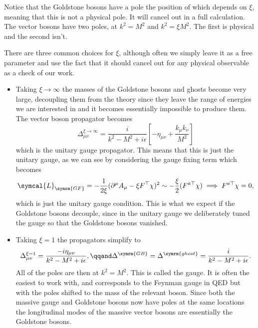 \documentclass[fleqn]{NotesClass}
\newcommand{\lagrangianDensity}{\symcal{L}}
\newcommand{\minkowskiMetric}{\eta}
\newcommand{\trans}{\top}
\begin{document}
    Notice that the Goldstone bosons have a pole the position of which depends on \(\xi\), meaning that this is not a physical pole.
    It will cancel out in a full calculation.
    The vector bosons have two poles, at \(k^2 = M^2\) and \(k^2 = \xi M^2\).
    The first is physical and the second isn't.
    
    There are three common choices for \(\xi\), although often we simply leave it as a free parameter and use the fact that it should cancel out for any physical observable as a check of our work.
    \begin{itemize}
        \item Taking \(\xi \to \infty\) the masses of the Goldstone bosons and ghosts become very large, decoupling them from the theory since they leave the range of energies we are interested in and it becomes essentially impossible to produce them.
        The vector boson propagator becomes
        \begin{equation}
            \Delta_{\mu\nu}^{\xi \to \infty} = \frac{i}{k^2 - M^2 + i\epsilon} \left[ -\minkowskiMetric_{\mu\nu} + \frac{k_\mu k_\nu}{M^2} \right]
        \end{equation}
        which is the unitary gauge propagator.
        This means that this is just the unitary gauge, as we can see by considering the gauge fixing term which becomes
        \begin{equation}
            \lagrangianDensity_{\symrm{GF}} = -\frac{1}{2\xi}(\partial^\mu A_\mu - \xi F^\trans \chi)^2 \sim -\frac{\xi}{2}(F^{a\trans} \chi) \implies F^{a\trans}\chi = 0,
        \end{equation}
        which is just the unitary gauge condition.
        This is what we expect if the Goldstone bosons decouple, since in the unitary gauge we deliberately tuned the gauge so that the Goldstone bosons vanished.
        
        \item Taking \(\xi = 1\) the propagators simplify to
        \begin{equation}
            \Delta_{\mu\nu}^{\xi = 1} = \frac{-i\minkowskiMetric_{\mu\nu}}{k^2 - M^2 + i\epsilon}, \qqand \Delta^{\symrm{GB}} = \Delta^{\symrm{ghost}} = \frac{i}{k^2 - M^2 + i\epsilon}.
        \end{equation}
        All of the poles are then at \(k^2 = M^2\).
        This is called the  gauge.
        It is often the easiest to work with, and corresponds to the Feynman gauge in QED but with the poles shifted to the mass of the relevant boson.
        Since both the massive gauge and Goldstone bosons now have poles at the same locations the longitudinal modes of the massive vector bosons are essentially the Goldstone bosons.
        

\end{itemize}
\end{document}
